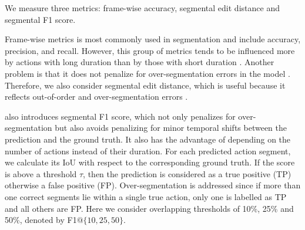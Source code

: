 
We measure three metrics: frame-wise accuracy, segmental edit distance and segmental F1 score.

Frame-wise metrics is most commonly used in segmentation and include accuracy, precision, and recall. However, this group of metrics tends to be influenced more by actions with long duration than by those with short duration \cite{wang2020temporal}. Another problem is that it does not penalize for over-segmentation errors in the model \cite{wang2020temporal, 8099596}.
Therefore, we also consider segmental edit distance, which is useful because it reflects out-of-order and over-segmentation errors \cite{ 8099596}. 

\cite{8099596} also introduces segmental F1 score, which not only penalizes for over-segmentation but also avoids penalizing for minor temporal shifts between the prediction and the ground truth. It also has the advantage of depending on the number of actions instead of their duration. For each predicted action segment, we calculate its IoU with respect to the corresponding ground truth. If the score is above a threshold $\tau$, then the prediction is considered as a true positive (TP) otherwise a false positive (FP). Over-segmentation is addressed since if more than one correct segments lie within a single true action, only one is labelled as TP and all others are FP. Here we consider overlapping thresholds of 10\%, 25\% and 50\%, denoted by F1$@\{10,25,50\}$. 







